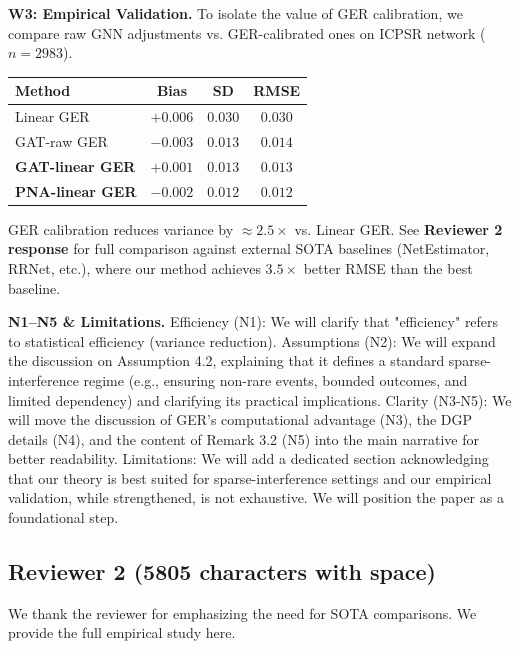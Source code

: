 \documentclass{article}
\theoremstyle{plain}
\theoremstyle{definition}
\theoremstyle{remark}
\begin{document}
\vspace{0.5em}
\noindent\textbf{W3: Empirical Validation.}
To isolate the value of GER calibration, we compare raw GNN adjustments vs. GER-calibrated ones on ICPSR network ($n=2983$).
\begin{center}\small
\begin{tabular}{lccc}
\toprule
Method & Bias & SD & RMSE \\
\midrule
Linear GER & $+0.006$ & $0.030$ & $0.030$ \\
GAT-raw GER & $-0.003$ & $0.013$ & $0.014$ \\
\textbf{GAT-linear GER} & $+0.001$ & $0.013$ & $\mathbf{0.013}$ \\
\textbf{PNA-linear GER} & $-0.002$ & $0.012$ & $\mathbf{0.012}$ \\
\bottomrule
\end{tabular}
\end{center}
GER calibration reduces variance by $\approx 2.5\times$ vs. Linear GER. See \textbf{Reviewer 2 response} for full comparison against external SOTA baselines (NetEstimator, RRNet, etc.), where our method achieves $3.5\times$ better RMSE than the best baseline.

\vspace{0.5em}
\noindent\textbf{N1--N5 \& Limitations.}
Efficiency (N1): We will clarify that "efficiency" refers to statistical efficiency (variance reduction).
Assumptions (N2): We will expand the discussion on Assumption 4.2, explaining that it defines a standard sparse-interference regime (e.g., ensuring non-rare events, bounded outcomes, and limited dependency) and clarifying its practical implications.
Clarity (N3-N5): We will move the discussion of GER's computational advantage (N3), the DGP details (N4), and the content of Remark 3.2 (N5) into the main narrative for better readability.
Limitations: We will add a dedicated section acknowledging that our theory is best suited for sparse-interference settings and our empirical validation, while strengthened, is not exhaustive. We will position the paper as a foundational step.
\subsection{Reviewer 2 (5805 characters with space)}
 We thank the reviewer for emphasizing the need for SOTA comparisons. We provide the full empirical study here.
\end{document}

